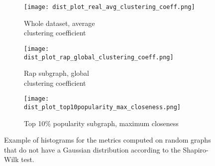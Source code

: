 \begin{figure*}
    \centering
    \begin{subfigure}{.33\textwidth}
      \centering
      \captionsetup{justification=centering}
      \texttt{[image: dist\_plot\_real\_avg\_clustering\_coeff.png]}
      \caption{Whole dataset, average \\ clustering coefficient}
      \label{fig:hist1}
    \end{subfigure}%
    \begin{subfigure}{.33\textwidth}
      \centering
      \captionsetup{justification=centering}
      \texttt{[image: dist\_plot\_rap\_global\_clustering\_coeff.png]}
      \caption{Rap subgraph, global \\ clustering coefficient}
      \label{fig:hist2}
    \end{subfigure}
    \begin{subfigure}{.33\textwidth}
      \centering
      \captionsetup{justification=centering}
      \texttt{[image: dist\_plot\_top10popularity\_max\_closeness.png]}
      \caption{Top 10\% popularity subgraph, maximum closeness}
      \label{fig:hist3}
    \end{subfigure}
    \caption{Example of histograms for the metrics computed on random graphs that do not have a Gaussian distribution according to the Shapiro-Wilk test.}
    \label{fig:hist}
\end{figure*}
